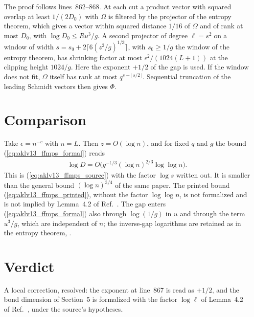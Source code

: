 \documentclass{article}
\begin{document}
The proof follows lines~862--868. At each cut a product vector with squared
overlap at least $1/(2D_0)$ with $\Omega$ is filtered by the projector of the
entropy theorem, which gives a vector within squared distance $1/16$ of
$\Omega$ and of rank at most $D_0$, with $\log D_0\le Ru^3/g$. A second
projector of degree $\ell=s^2$ on a window of width
$s=s_0+2\lceil6(z^2/g)^{1/3}\rceil$, with $s_0\ge1/g$ the window of the entropy
theorem, has shrinking factor at most $\epsilon^2/(1024(L+1))$ at the clipping
height $1024/g$. Here the exponent $+1/2$ of the gap is used. If the window
does not fit, $\Omega$ itself has rank at most $q^{s-\lfloor s/2\rfloor}$.
Sequential truncation of the leading Schmidt vectors then gives $\Phi$.

\section{Comparison}

Take $\epsilon=n^{-c}$ with $n=L$. Then $z=O(\log n)$, and for fixed $q$ and
$g$ the bound (\ref{eq:aklv13_ffmps_formal}) reads
\begin{align}
    \log D=O\bigl(g^{-1/3}(\log n)^{2/3}\log\log n\bigr).
    \label{eq:aklv13_ffmps_asymptotic}
\end{align}
This is (\ref{eq:aklv13_ffmps_source}) with the factor $\log s$ written out.
It is smaller than the general bound $(\log n)^{3/4}$ of the same paper. The
printed bound (\ref{eq:aklv13_ffmps_printed}), without the factor
$\log\log n$, is not formalized and is not implied by Lemma~4.2 of Ref.~\cite{Arad2013AreaLaw}.
The gap enters (\ref{eq:aklv13_ffmps_formal}) also through $\log(1/g)$ in
$u$ and through the term $u^3/g$, which are independent of $n$; the inverse-gap
logarithms are retained as in the entropy theorem,
.

\section{Verdict}

A local correction, resolved: the exponent at line~867 is read as $+1/2$, and
the bond dimension of Section~5 is formalized with the factor $\log\ell$ of
Lemma~4.2 of Ref.~\cite{Arad2013AreaLaw}, under the source's hypotheses.



\end{document}
